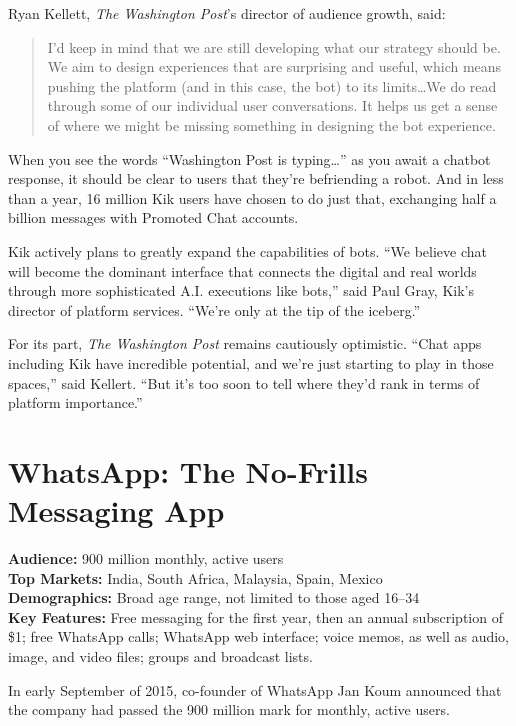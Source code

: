 \documentclass[notoc, symmetric, nobib, nols]{towcenter-guideto-book}
\begin{document}
Ryan Kellett, \textit{The Washington Post}'s director of audience growth, said: 

\begin{quote}
I'd keep in mind that we are still developing what our strategy should be. We aim to design experiences that are surprising and useful, which means pushing the platform (and in this case, the bot) to its limits\ldots We do read through some of our individual user conversations. It helps us get a sense of where we might be missing something in designing the bot experience. 
\end{quote}

When you see the words ``Washington Post is typing\ldots '' as you await a chatbot response, it should be clear to users that they're befriending a robot. And in less than a year, 16 million Kik users have chosen to do just that, exchanging half a billion messages with Promoted Chat accounts.  

Kik actively plans to greatly expand the capabilities of bots. ``We believe chat will become the dominant interface that connects the digital and real worlds through more sophisticated A.I. executions like bots,'' said Paul Gray, Kik's director of platform services. ``We're only at the tip of the iceberg.''  

For its part, \textit{The Washington Post} remains cautiously optimistic. ``Chat apps including Kik have incredible potential, and we're just starting to play in those spaces,'' said Kellert. ``But it's too soon to tell where they'd rank in terms of platform importance.'' 

\section{WhatsApp: The No-Frills Messaging App}

\begin{framed}
\noindent\textbf{Audience:} 900 million monthly, active users \\
\noindent\textbf{Top Markets:} India, South Africa, Malaysia, Spain, Mexico \\
\noindent\textbf{Demographics:} Broad age range, not limited to those aged 16--34\\
\noindent\textbf{Key Features:} Free messaging for the first year, then an annual subscription of \$1; free WhatsApp calls; WhatsApp web interface; voice memos, as well as audio, image, and video files; groups and broadcast lists.
\end{framed}
\vspace{\baselineskip}
In early September of 2015, co-founder of WhatsApp Jan Koum announced that the company had passed the 900 million mark for monthly, active users.\autocite{FacebookWhatsApp}
\end{document}
